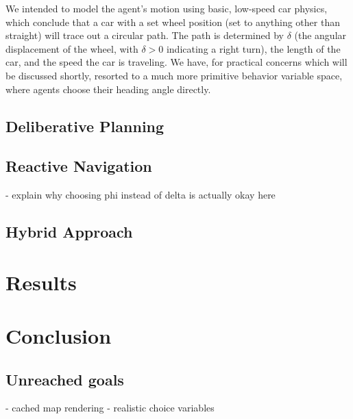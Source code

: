 \documentclass{article}
\begin{document}
We intended to model the agent's motion using basic, low-speed car physics,
which conclude that a car with a set wheel position (set to anything other than
straight) will trace out a circular path. The path is determined by $\delta$
(the angular displacement of the wheel, with $\delta>0$ indicating a right
turn), the length of the car, and the speed the car is traveling. We have, for
practical concerns which will be discussed shortly, resorted to a much more
primitive behavior variable space, where agents choose their heading angle
directly.

\subsection{Deliberative Planning}

\subsection{Reactive Navigation}
- explain why choosing phi instead of delta is actually okay here

\subsection{Hybrid Approach}

\section{Results}

\section{Conclusion}
\subsection{Unreached goals}
- cached map rendering
- realistic choice variables
\end{document}
